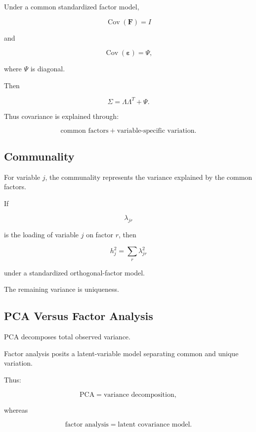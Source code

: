 Under a common standardized factor model,

\[
\operatorname{Cov}(\mathbf{F})=I
\]

and

\[
\operatorname{Cov}(\boldsymbol{\varepsilon})
=
\Psi,
\]

where \(\Psi\) is diagonal.

Then

\[
\boxed{
\Sigma
=
\Lambda\Lambda^T
+
\Psi.
}
\]

Thus covariance is explained through:

\[
\boxed{
\text{common factors}
+
\text{variable-specific variation}.
}
\]

\subsection{Communality}
\label{subsec:factor-analysis-communality}

For variable \(j\), the communality represents the variance explained by
the common factors.

If

\[
\lambda_{jr}
\]

is the loading of variable \(j\) on factor \(r\), then

\[
\boxed{
h_j^2
=
\sum_r
\lambda_{jr}^2
}
\]

under a standardized orthogonal-factor model.

The remaining variance is uniqueness.

\subsection{PCA Versus Factor Analysis}
\label{subsec:pca-versus-factor-analysis}

PCA decomposes total observed variance.

Factor analysis posits a latent-variable model separating common and
unique variation.

Thus:

\[
\boxed{
\text{PCA}
=
\text{variance decomposition},
}
\]

whereas

\[
\boxed{
\text{factor analysis}
=
\text{latent covariance model}.
}
\]

